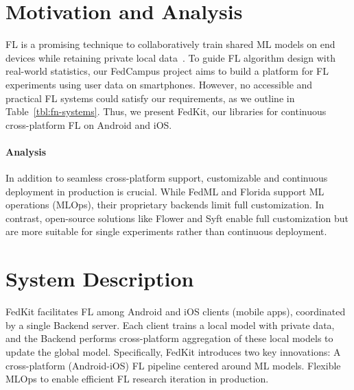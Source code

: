 \documentclass[conference]{IEEEtran}
\begin{document}
\section{Motivation and Analysis}

FL is a promising technique to collaboratively train shared ML models on
end devices while retaining private local data~\cite{wang2023federated}.
To guide FL algorithm design with real-world statistics,
our FedCampus project aims to build a platform for
FL experiments using user data on smartphones.
However, no accessible and practical FL systems could satisfy our requirements,
as we outline in Table~\ref{tbl:fn-systems}.
Thus, we present FedKit,
our libraries for continuous cross-platform FL on Android and iOS.

\paragraph{Analysis}
In addition to seamless cross-platform support,
customizable and continuous deployment in production is crucial.
While FedML and Florida support ML operations (MLOps),
their proprietary backends limit full customization.
In contrast, open-source solutions like Flower and Syft enable
full customization
but are more suitable for single experiments rather than continuous deployment.

\section{System Description}

FedKit facilitates FL among Android and iOS clients (mobile apps),
coordinated by a single Backend server.
Each client trains a local model with private data,
and the Backend performs cross-platform aggregation of these local models to update the global model.
Specifically, FedKit introduces two key innovations:
 A cross-platform (Android-iOS) FL pipeline centered around ML models.
 Flexible MLOps to enable efficient FL research iteration in production.
\end{document}
